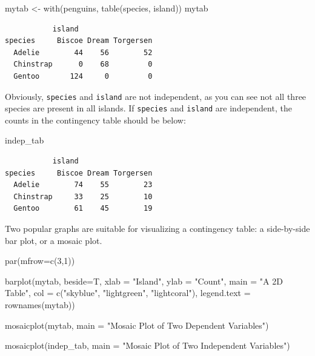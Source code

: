 \documentclass[
  letterpaper,
  DIV=11,
  numbers=noendperiod]{scrreprt}
\newenvironment{Shaded}{\begin{snugshade}}{\end{snugshade}}
\newcommand{\AttributeTok}[1]{\textcolor[rgb]{0.40,0.45,0.13}{#1}}
\newcommand{\DecValTok}[1]{\textcolor[rgb]{0.68,0.00,0.00}{#1}}
\newcommand{\FunctionTok}[1]{\textcolor[rgb]{0.28,0.35,0.67}{#1}}
\newcommand{\NormalTok}[1]{\textcolor[rgb]{0.00,0.23,0.31}{#1}}
\newcommand{\OtherTok}[1]{\textcolor[rgb]{0.00,0.23,0.31}{#1}}
\newcommand{\StringTok}[1]{\textcolor[rgb]{0.13,0.47,0.30}{#1}}
\begin{document}
\begin{Shaded}
\begin{Highlighting}[]
\NormalTok{mytab }\OtherTok{\textless{}{-}} \FunctionTok{with}\NormalTok{(penguins, }\FunctionTok{table}\NormalTok{(species, island))}
\NormalTok{mytab}
\end{Highlighting}
\end{Shaded}

\begin{verbatim}
           island
species     Biscoe Dream Torgersen
  Adelie        44    56        52
  Chinstrap      0    68         0
  Gentoo       124     0         0
\end{verbatim}

Obviously, \texttt{species} and \texttt{island} are not independent, as
you can see not all three species are present in all islands. If
\texttt{species} and \texttt{island} are independent, the counts in the
contingency table should be below:

\begin{Shaded}
\begin{Highlighting}[]
\NormalTok{indep\_tab}
\end{Highlighting}
\end{Shaded}

\begin{verbatim}
           island
species     Biscoe Dream Torgersen
  Adelie        74    55        23
  Chinstrap     33    25        10
  Gentoo        61    45        19
\end{verbatim}

Two popular graphs are suitable for visualizing a contingency table: a
side-by-side bar plot, or a mosaic plot.

\begin{Shaded}
\begin{Highlighting}[]
\FunctionTok{par}\NormalTok{(}\AttributeTok{mfrow=}\FunctionTok{c}\NormalTok{(}\DecValTok{3}\NormalTok{,}\DecValTok{1}\NormalTok{))}

\FunctionTok{barplot}\NormalTok{(mytab,}
        \AttributeTok{beside=}\NormalTok{T,}
        \AttributeTok{xlab =} \StringTok{"Island"}\NormalTok{,}
        \AttributeTok{ylab =} \StringTok{"Count"}\NormalTok{,}
        \AttributeTok{main =} \StringTok{"A 2D Table"}\NormalTok{,}
        \AttributeTok{col =} \FunctionTok{c}\NormalTok{(}\StringTok{"skyblue"}\NormalTok{, }\StringTok{"lightgreen"}\NormalTok{, }\StringTok{"lightcoral"}\NormalTok{),}
        \AttributeTok{legend.text =} \FunctionTok{rownames}\NormalTok{(mytab))}

\FunctionTok{mosaicplot}\NormalTok{(mytab, }\AttributeTok{main =} \StringTok{"Mosaic Plot of Two Dependent Variables"}\NormalTok{)}

\FunctionTok{mosaicplot}\NormalTok{(indep\_tab, }\AttributeTok{main =} \StringTok{"Mosaic Plot of Two Independent Variables"}\NormalTok{)}
\end{Highlighting}
\end{Shaded}
\end{document}
